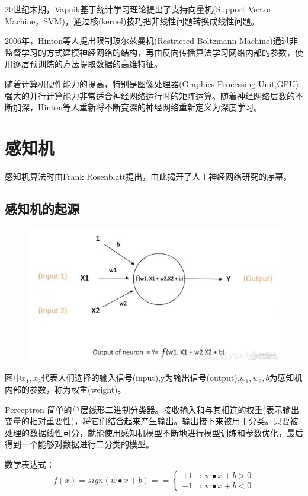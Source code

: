 \documentclass[openbib]{article}
\begin{document}
20世纪末期，Vapnik基于统计学习理论提出了支持向量机(Support Vector Machine，SVM)，通过核(kernel)技巧把非线性问题转换成线性问题。

2006年，Hinton等人提出限制玻尔兹曼机(Restricted Boltzmann Machine)通过非监督学习的方式建模神经网络的结构，再由反向传播算法学习网络内部的参数，使用逐层预训练的方法提取数据的高维特征。

随着计算机硬件能力的提高，特别是图像处理器(Graphics Processing Unit,GPU)强大的并行计算能力非常适合神经网络运行时的矩阵运算。随着神经网络层数的不断加深，Hinton等人重新将不断变深的神经网络重新定义为深度学习。

\section{感知机}
感知机算法时由Frank Rosenblatt提出，由此揭开了人工神经网络研究的序幕。
\subsection{感知机的起源}

\begin{figure}[htbp]
	\centering
	\includegraphics[scale=0.4]{感知机}
\end{figure}

图中$x_1,x_2$代表人们选择的输入信号(input),y为输出信号(output),$w_1,w_2,b$为感知机内部的参数，称为权重(weight)。

Perceptron 简单的单层线形二进制分类器。接收输入和与其相连的权重(表示输出变量的相对重要性)，将它们结合起来产生输出。输出接下来被用于分类。只要被处理的数据线性可分，就能使用感知机模型不断地进行模型训练和参数优化，最后得到一个能够对数据进行二分类的模型。
	
数学表达式：$$f(x) = sign(w\bullet x + b)== \left\{ \begin{array}{cl}
		+1 & : \ w\bullet x + b> 0 \\
		-1 & : \  w\bullet x + b< 0
	\end{array} \right.$$
	
\end{document}
